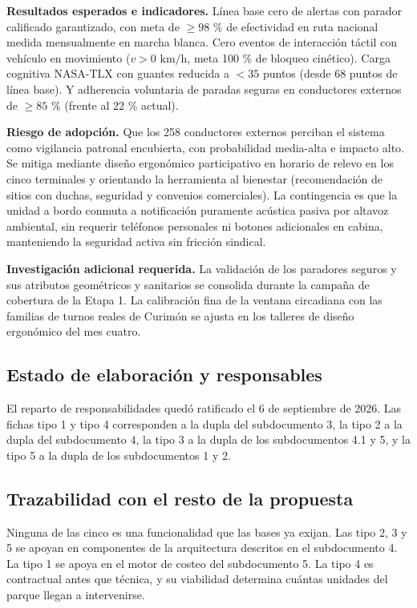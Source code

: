 \textbf{Resultados esperados e indicadores.} Línea base cero de alertas con parador calificado garantizado, con meta de $\ge 98\text{ \%}$ de efectividad en ruta nacional medida mensualmente en marcha blanca. Cero eventos de interacción táctil con vehículo en movimiento ($v > 0\text{ km/h}$, meta 100 \% de bloqueo cinético). Carga cognitiva NASA-TLX con guantes reducida a $< 35$ puntos (desde 68 puntos de línea base). Y adherencia voluntaria de paradas seguras en conductores externos de $\ge 85\text{ \%}$ (frente al 22 \% actual).

\textbf{Riesgo de adopción.} Que los 258 conductores externos perciban el sistema como vigilancia patronal encubierta, con probabilidad media-alta e impacto alto. Se mitiga mediante diseño ergonómico participativo en horario de relevo en los cinco terminales y orientando la herramienta al bienestar (recomendación de sitios con duchas, seguridad y convenios comerciales). La contingencia es que la unidad a bordo conmuta a notificación puramente acústica pasiva por altavoz ambiental, sin requerir teléfonos personales ni botones adicionales en cabina, manteniendo la seguridad activa sin fricción sindical.

\textbf{Investigación adicional requerida.} La validación de los paradores seguros y sus atributos geométricos y sanitarios se consolida durante la campaña de cobertura de la Etapa 1. La calibración fina de la ventana circadiana con las familias de turnos reales de Curimón se ajusta en los talleres de diseño ergonómico del mes cuatro.

\subsection{Estado de elaboración y responsables}

El reparto de responsabilidades quedó ratificado el 6 de septiembre de 2026. Las fichas tipo 1 y
tipo 4 corresponden a la dupla del subdocumento 3, la tipo 2 a la dupla del subdocumento 4, la tipo
3 a la dupla de los subdocumentos 4.1 y 5, y la tipo 5 a la dupla de los subdocumentos 1 y 2.

\subsection{Trazabilidad con el resto de la propuesta}

Ninguna de las cinco es una funcionalidad que las bases ya exijan. Las tipo 2, 3 y 5 se apoyan en
componentes de la arquitectura descritos en el subdocumento 4. La tipo 1 se apoya en el motor de
costeo del subdocumento 5. La tipo 4 es contractual antes que técnica, y su viabilidad determina
cuántas unidades del parque llegan a intervenirse.
